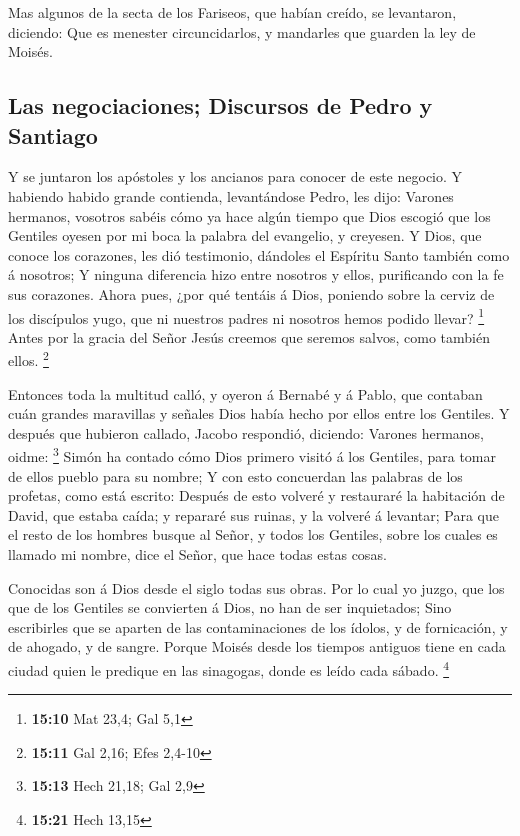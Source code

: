  Mas algunos de la secta de los Fariseos, que habían creído,
se levantaron, diciendo: Que es menester circuncidarlos, y mandarles que
guarden la ley de Moisés.

\hypertarget{las-negociaciones-discursos-de-pedro-y-santiago}{%
\subsection{Las negociaciones; Discursos de Pedro y
Santiago}\label{las-negociaciones-discursos-de-pedro-y-santiago}}

 Y se juntaron los apóstoles y los ancianos para conocer de
este negocio.  Y habiendo habido grande contienda,
levantándose Pedro, les dijo: Varones hermanos, vosotros sabéis cómo ya
hace algún tiempo que Dios escogió que los Gentiles oyesen por mi boca
la palabra del evangelio, y creyesen.  Y Dios, que conoce
los corazones, les dió testimonio, dándoles el Espíritu Santo también
como á nosotros;  Y ninguna diferencia hizo entre nosotros y
ellos, purificando con la fe sus corazones.  Ahora pues,
¿por qué tentáis á Dios, poniendo sobre la cerviz de los discípulos
yugo, que ni nuestros padres ni nosotros hemos podido llevar?
\footnote{\textbf{15:10} Mat 23,4; Gal 5,1}  Antes por la
gracia del Señor Jesús creemos que seremos salvos, como también ellos.
\footnote{\textbf{15:11} Gal 2,16; Efes 2,4-10}

 Entonces toda la multitud calló, y oyeron á Bernabé y á
Pablo, que contaban cuán grandes maravillas y señales Dios había hecho
por ellos entre los Gentiles.  Y después que hubieron
callado, Jacobo respondió, diciendo: Varones hermanos, oidme:
\footnote{\textbf{15:13} Hech 21,18; Gal 2,9}  Simón ha
contado cómo Dios primero visitó á los Gentiles, para tomar de ellos
pueblo para su nombre;  Y con esto concuerdan las palabras
de los profetas, como está escrito:  Después de esto
volveré y restauraré la habitación de David, que estaba caída; y
repararé sus ruinas, y la volveré á levantar;  Para que el
resto de los hombres busque al Señor, y todos los Gentiles, sobre los
cuales es llamado mi nombre, dice el Señor, que hace todas estas cosas.

 Conocidas son á Dios desde el siglo todas sus obras.
 Por lo cual yo juzgo, que los que de los Gentiles se
convierten á Dios, no han de ser inquietados;  Sino
escribirles que se aparten de las contaminaciones de los ídolos, y de
fornicación, y de ahogado, y de sangre.  Porque Moisés
desde los tiempos antiguos tiene en cada ciudad quien le predique en las
sinagogas, donde es leído cada sábado. \footnote{\textbf{15:21} Hech
  13,15}

